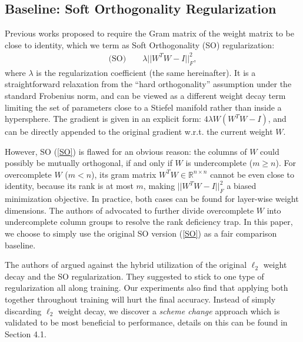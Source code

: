 \documentclass{article}
\newcommand{\R}{\mathbb{R}}
\newcounter{ass_counter}
\begin{document}
\subsection{Baseline: Soft Orthogonality Regularization}
Previous works \cite{xie2017all,balestriero2018spline,balestriero2018mad} proposed to require the Gram matrix of the weight matrix to be close to identity, which we term as Soft Orthogonality  (SO) regularization:
\begin{equation}
\begin{aligned}
\text{(SO)} \qquad \lambda ||W^T W - I||_F^2,
\end{aligned}
\label{SO}
\end{equation}
where $\lambda$ is the regularization coefficient (the same hereinafter). It is a straightforward relaxation from the ``hard orthogonality'' assumption \cite{harandi2016generalized,ozay2016optimization,huang2017orthogonal,wang2018learning} under the standard Frobenius norm, and can be viewed as a different weight decay term  limiting the set of parameters close to a Stiefel manifold rather than inside a hypersphere. The gradient is given in an explicit form: $4 \lambda W (W^TW - I)$, and can be directly appended to the original gradient w.r.t. the current weight $W$.

However, SO (\ref{SO}) is flawed for an obvious reason: the columns of $W$ could possibly be mutually orthogonal, if and only if $W$ is undercomplete ($m \ge n$). For overcomplete $W$ ($m < n$), its gram matrix $W^TW\in\R^{n \times n}$ cannot be even close to identity, because its rank is at most $m$, making $||W^T W - I||_F^2$ a biased minimization objective. In practice, both cases can be found for layer-wise weight dimensions. The authors of \cite{huang2017orthogonal,xie2017all} advocated to further divide overcomplete $W$ into undercomplete column groups to resolve the rank deficiency trap. In this paper, we choose to simply use the original SO version (\ref{SO}) as a fair comparison baseline.

The authors of \cite{xie2017all} argued against the hybrid utilization of the original $\ell_2$ weight decay and the SO regularization. They suggested to stick to one type of regularization all along training. Our experiments also find that applying both together throughout training will hurt the final accuracy. Instead of simply discarding $\ell_2$ weight decay, we discover a \textit{scheme change} approach which is validated to be most beneficial to performance, details on this can be found in Section 4.1.
\end{document}
